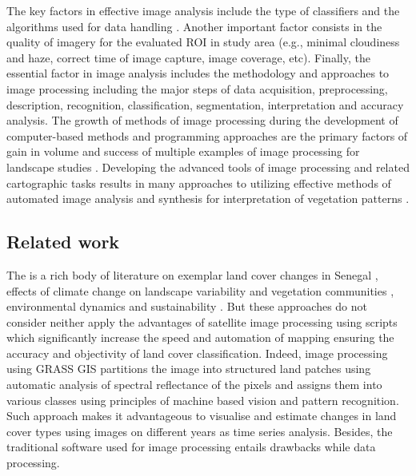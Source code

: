 \documentclass[earth,article,submit,pdftex,moreauthors]{Definitions/mdpi}
\begin{document}
The key factors in effective image analysis include the type of classifiers and the algorithms used for data handling \cite{Lemenkova202212}. Another important factor consists in the quality of imagery for the evaluated ROI in study area (e.g., minimal cloudiness and haze, correct time of image capture, image coverage, etc). Finally, the essential factor in image analysis includes the methodology and approaches to image processing including the major steps of data acquisition, preprocessing, description, recognition, classification, segmentation, interpretation and accuracy analysis. The growth of methods of image processing during the development of computer-based methods and programming approaches are the primary factors of gain in volume and success of multiple examples of image processing for landscape studies \cite{Duncan,jimaging9050098,Purkis,info14040249,DIOUF2001129}. Developing the advanced tools of image processing and related cartographic tasks results in many approaches to utilizing effective methods of automated image analysis and synthesis for interpretation of vegetation patterns \cite{SUOMALAINEN2021112691,OlsonAnderson,Lemenkova202227,Ali,Olsonetal2019,Lemenkova202229}.

\subsection{Related work}

The is a rich body of literature on exemplar land cover changes in Senegal \cite{WOOD2004565,ELBERLING200337,Hiraldo}, effects of climate change on landscape variability and vegetation communities \cite{LIU2004583,TSCHAKERT2004535,LUFAFA20081}, environmental dynamics and sustainability \cite{CAMARA2017204}. But these approaches do not consider neither apply the advantages of satellite image processing using scripts which significantly increase the speed and automation of mapping ensuring the accuracy and objectivity of land cover classification. Indeed, image processing using GRASS GIS partitions the image into structured land patches using automatic analysis of spectral reflectance of the pixels and assigns them into various classes using principles of machine based vision and pattern recognition. Such approach makes it advantageous to visualise and estimate changes in land cover types using images on different years as time series analysis. Besides, the traditional software used for image processing entails drawbacks while data processing. 
\end{document}
